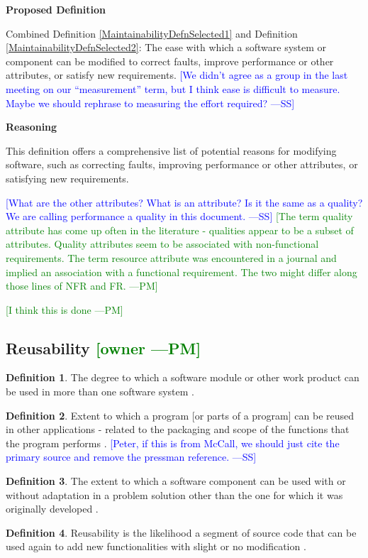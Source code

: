 \documentclass[letterpaper,cleveref]{lipics-v2019}
\newcommand{\authornote}[3]{\textcolor{#1}{[#3 ---#2]}}
\newcommand{\authornote}[3]{}
\newcommand{\wss}[1]{\authornote{blue}{SS}{#1}} %
\newcommand{\pmi}[1]{\authornote{green}{PM}{#1}} %
\theoremstyle{definition}
\newtheorem{defn}{Definition}
\begin{document}
\noindent \textbf{Proposed Definition}

Combined Definition \ref{MaintainabilityDefnSelected1} and Definition
\ref{MaintainabilityDefnSelected2}: The ease with which a software system or
component can be modified to correct faults, improve performance or other
attributes, or satisfy new requirements. \wss{We didn't agree as a group in the
  last meeting on our ``measurement'' term, but I think ease is difficult to
  measure.  Maybe we should rephrase to measuring the effort required?}

\noindent \textbf{Reasoning}

This definition offers a comprehensive list of potential reasons for modifying
software, such as correcting faults, improving performance or other attributes,
or satisfying new requirements.

\wss{What are the other attributes?  What is an attribute?  Is it the
	same as a quality?  We are calling performance a quality in this document.}
\pmi{The term quality attribute has come up often in the literature - qualities
	appear to be a subset of attributes. Quality attributes seem to be associated
	with non-functional requirements. The term resource attribute was encountered in
	a journal and implied an association with a functional requirement. The two
	might differ along those lines of NFR and FR.}

\pmi{I think this is done}

\subsection{{Reusability} \pmi{owner}}

\begin{defn} 
  The degree to which a software module or other work product can be used in
  more than one software system \citep{IEEEStdGlossarySET1990}.
\end{defn}
\begin{defn}
  Extent to which a program [or parts of a program] can be reused in other
  applications - related to the packaging and scope of the functions that the
  program performs \citep{pressman2005software}. \wss{Peter, if this is from
    McCall, we should just cite the primary source and remove the pressman
    reference.}
\end{defn}
\begin{defn} \label{ReusabilityDefnSelected} 
  The extent to which a software component can be used with or without
  adaptation in a problem solution other than the one for which it was
  originally developed \citep{kalagiakos2003non}.
\end{defn}
\begin{defn}
  Reusability is the likelihood a segment of source code that can be used again
  to add new functionalities with slight or no modification
  \citep{sandhu2010survey}.
\end{defn}
\end{document}

